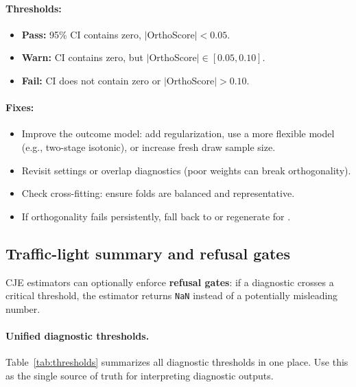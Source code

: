 \paragraph{Thresholds:}
\begin{itemize}
\item \textbf{Pass:} 95\% CI contains zero, $|$OrthoScore$| < 0.05$.
\item \textbf{Warn:} CI contains zero, but $|$OrthoScore$| \in [0.05, 0.10]$.
\item \textbf{Fail:} CI does not contain zero or $|$OrthoScore$| > 0.10$.
\end{itemize}

\paragraph{Fixes:}
\begin{itemize}
\item Improve the outcome model: add regularization, use a more flexible model (e.g., two-stage isotonic), or increase fresh draw sample size.
\item Revisit \simcal{} settings or overlap diagnostics (poor weights can break orthogonality).
\item Check cross-fitting: ensure folds are balanced and representative.
\item If orthogonality fails persistently, fall back to \ips{} or regenerate for \dm.
\end{itemize}

\subsection{Traffic-light summary and refusal gates}

CJE estimators can optionally enforce \textbf{refusal gates}: if a diagnostic crosses a critical threshold, the estimator returns \texttt{NaN} instead of a potentially misleading number.

\paragraph{Unified diagnostic thresholds.}

Table~\ref{tab:thresholds} summarizes all diagnostic thresholds in one place. Use this as the single source of truth for interpreting diagnostic outputs.


